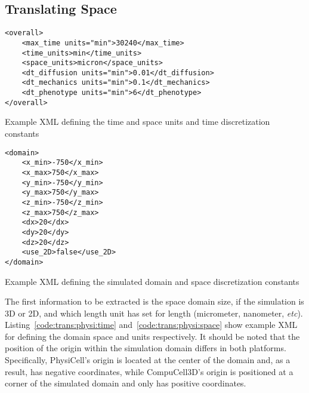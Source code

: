 \subsection{Translating Space}\label{sec:trans:impl:space}
\begin{listing}[H]%
\begin{verbatim}
<overall>
    <max_time units="min">30240</max_time> 
    <time_units>min</time_units>
    <space_units>micron</space_units>
    <dt_diffusion units="min">0.01</dt_diffusion>
    <dt_mechanics units="min">0.1</dt_mechanics>
    <dt_phenotype units="min">6</dt_phenotype>	
</overall>
\end{verbatim}
\caption{Example \pscs XML defining the time and space units and time discretization constants}\label{code:trans:physi:time}
\end{listing}
\begin{listing}[H]%
\begin{verbatim}
<domain>
    <x_min>-750</x_min>
    <x_max>750</x_max>
    <y_min>-750</y_min>
    <y_max>750</y_max>
    <z_min>-750</z_min>
    <z_max>750</z_max>
    <dx>20</dx>
    <dy>20</dy>
    <dz>20</dz>
    <use_2D>false</use_2D>
</domain>
\end{verbatim}
\caption{Example \pscs XML defining the simulated domain and space discretization constants}\label{code:trans:physi:space}
\end{listing}



The first information to be extracted is the space domain size, if the simulation is 3D or 2D, and which length unit \pscs has set for length (micrometer, nanometer, \textit{etc}). Listing~\ref{code:trans:physi:time} and~\ref{code:trans:physi:space} show example \pscs XML for defining the domain space and units respectively. It should be noted that the position of the origin within the simulation domain differs in both platforms. Specifically, PhysiCell's origin is located at the center of the domain and, as a result, has negative coordinates, while CompuCell3D's origin is positioned at a corner of the simulated domain and only has positive coordinates.



